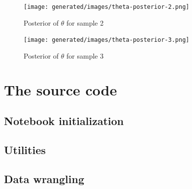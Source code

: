 \documentclass[
  digital, %
  oneside, %
  lof,     %
  lot,     %
]{fithesis4}
\begin{document}
\begin{figure}[H]
  \begin{center}
    \texttt{[image: generated/images/theta-posterior-2.png]}
  \end{center}
  \caption{Posterior of $\theta$ for sample 2}
  \label{fig:theta-posterior-2}
\end{figure}

\begin{figure}[H]
  \begin{center}
    \texttt{[image: generated/images/theta-posterior-3.png]}
  \end{center}
  \caption{Posterior of $\theta$ for sample 3}
  \label{fig:theta-posterior-3}
\end{figure}

\newpage
\section{The source code}

\subsection{Notebook initialization}




\subsection{Utilities}







\subsection{Data wrangling}

% 
% 
% 
% 
% 
% 
% 
% 
% 
% 
\end{document}

